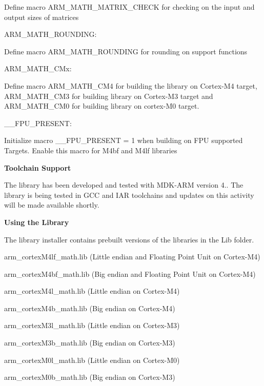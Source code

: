 Define macro A\-R\-M\-\_\-\-M\-A\-T\-H\-\_\-\-M\-A\-T\-R\-I\-X\-\_\-\-C\-H\-E\-C\-K for checking on the input and output sizes of matrices


\begin{DoxyItemize}
\item A\-R\-M\-\_\-\-M\-A\-T\-H\-\_\-\-R\-O\-U\-N\-D\-I\-N\-G\-:
\end{DoxyItemize}

Define macro A\-R\-M\-\_\-\-M\-A\-T\-H\-\_\-\-R\-O\-U\-N\-D\-I\-N\-G for rounding on support functions


\begin{DoxyItemize}
\item A\-R\-M\-\_\-\-M\-A\-T\-H\-\_\-\-C\-Mx\-:
\end{DoxyItemize}

Define macro A\-R\-M\-\_\-\-M\-A\-T\-H\-\_\-\-C\-M4 for building the library on Cortex-\/\-M4 target, A\-R\-M\-\_\-\-M\-A\-T\-H\-\_\-\-C\-M3 for building library on Cortex-\/\-M3 target and A\-R\-M\-\_\-\-M\-A\-T\-H\-\_\-\-C\-M0 for building library on cortex-\/\-M0 target.


\begin{DoxyItemize}
\item \-\_\-\-\_\-\-F\-P\-U\-\_\-\-P\-R\-E\-S\-E\-N\-T\-:
\end{DoxyItemize}

Initialize macro \-\_\-\-\_\-\-F\-P\-U\-\_\-\-P\-R\-E\-S\-E\-N\-T = 1 when building on F\-P\-U supported Targets. Enable this macro for M4bf and M4lf libraries

{\bfseries Toolchain Support}

The library has been developed and tested with M\-D\-K-\/\-A\-R\-M version 4.. The library is being tested in G\-C\-C and I\-A\-R toolchains and updates on this activity will be made available shortly.

{\bfseries Using the Library}

The library installer contains prebuilt versions of the libraries in the {\ttfamily Lib} folder.
\begin{DoxyItemize}
\item arm\-\_\-cortex\-M4lf\-\_\-math.\-lib (Little endian and Floating Point Unit on Cortex-\/\-M4)
\item arm\-\_\-cortex\-M4bf\-\_\-math.\-lib (Big endian and Floating Point Unit on Cortex-\/\-M4)
\item arm\-\_\-cortex\-M4l\-\_\-math.\-lib (Little endian on Cortex-\/\-M4)
\item arm\-\_\-cortex\-M4b\-\_\-math.\-lib (Big endian on Cortex-\/\-M4)
\item arm\-\_\-cortex\-M3l\-\_\-math.\-lib (Little endian on Cortex-\/\-M3)
\item arm\-\_\-cortex\-M3b\-\_\-math.\-lib (Big endian on Cortex-\/\-M3)
\item arm\-\_\-cortex\-M0l\-\_\-math.\-lib (Little endian on Cortex-\/\-M0)
\item arm\-\_\-cortex\-M0b\-\_\-math.\-lib (Big endian on Cortex-\/\-M3)
\end{DoxyItemize}

